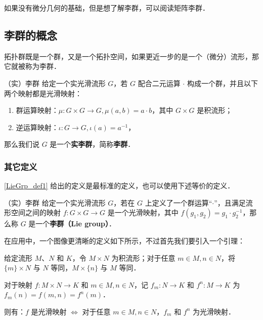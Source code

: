 

如果没有微分几何的基础，但是想了解李群，可以阅读矩阵李群．

\subsection{李群的概念}

拓扑群既是一个群，又是一个拓扑空间，如果更近一步的是一个（微分）流形，那它就被称为李群．
\begin{definition}{（实）李群}\label{LieGrp_def1}
给定一个实光滑流形 $G$，若 $G$ 配合二元运算 $\cdot$ 构成一个群，并且以下两个映射都是光滑映射：
\begin{enumerate}
\item 群运算映射：$\mu:G\times G\to G, \mu(a,b)=a\cdot b$，其中 $G\times G$ 是积流形；
\item 逆运算映射：$\iota:G\to G, \iota(a)=a^{-1}$，
\end{enumerate}
那么我们说 $G$ 是一个\textbf{实李群}，简称\textbf{李群}．
\end{definition}

\subsubsection{其它定义}

\autoref{LieGrp_def1} 给出的定义是最标准的定义，也可以使用下述等价的定义．

\begin{definition}{（实）李群}\label{LieGrp_def3}
给定一个实光滑流形 $G$，若在 $G$ 上定义了一个群运算“$\cdot$”，且满足流形空间之间的映射 $f:G\times G\rightarrow G$ 是一个光滑映射，其中 $f(g_1, g_2)=g_1\cdot g_2^{-1}$，那么称 $G$ 是一个\textbf{李群（Lie group）}．
\end{definition}

在应用中，一个图像更清晰的定义如下所示，不过首先我们要引入一个引理：

\begin{lemma}{}\label{LieGrp_lem1}
给定流形 $M$、$N$ 和 $K$，令 $M\times N$ 为积流形；对于任意 $m\in M, n\in N$，将 $\{m\}\times N$ 与 $N$ 等同，$M\times \{n\}$ 与 $M$ 等同．

对于映射 $f:M\times N\to K$ 和 $m\in M, n\in N$，记 $f_m:N\to K$ 和 $f^n:M\to K$ 为 $f_m(n)=f(m, n)=f^n(m)$．

则有：$f$ 是光滑映射 $\iff$ 对于任意 $m\in M, n\in N$，$f_m$ 和 $f^n$ 为光滑映射．
\end{lemma}

